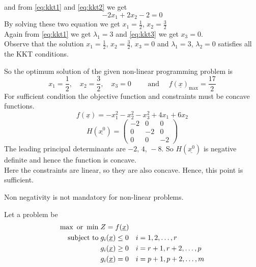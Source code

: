 \documentclass[../main-sheet.tex]{subfiles}
\begin{document}
\begin{soln}
\begin{enumerate}[label=Case \arabic*:]
\[            \]
            and from \eqref{eq:kkt1} and \eqref{eq:kkt2} we get
            \[
                -2x_1+2x_2-2=0
            \]
            By solving these two equation we get \(x_1=\frac{1}{2}\), \(x_2=\frac{3}{2}\)\\
            Again from \eqref{eq:kkt1} we get \(\lambda_1=3\) and \eqref{eq:kkt3} we get \(x_3=0\).\\
            Observe that the solution \(x_1=\frac{1}{2}\), \(x_2=\frac{3}{2}\), \(x_3=0\) and \(\lambda_1=3\), \(\lambda_2=0\) satisfies all the KKT conditions.
        \end{enumerate}
        So the optimum solution of the given non-linear programming problem is
        \[
            x_1=\frac{1}{2},\quad x_2=\frac{3}{2},\quad x_3=0\qquad \text{ and }\quad f(\underline{x})_{\max}=\frac{17}{2}
        \]
        For sufficient condition the objective function and constraints must be concave functions.
        \[
            f(\underline{x})=-x_1^2-x_2^2-x_3^2+4x_1+6x_2
        \]
        \[
            H(\underline{x^0})=\begin{pmatrix}
            -2&0&0\\
            0&-2&0\\
            0&0&-2
            \end{pmatrix}
        \]
        The leading principal determinants are \(-2,\,4,\,-8\). So \(H(\underline{x^0})\) is negative definite and hence the function is concave.\\
        Here the constraints are linear, so they are also concave. Hence, this point is sufficient.
    \end{soln}
    \begin{rem}
        Non negativity is not mandatory for non-linear problems.
    \end{rem}
    Let a problem be
    \begin{align*}
        \max\text{ or }\min &\; Z=f(\underline{x}) \\
        \text{subject to} &\;
        \begin{alignedat}[t]{1}
        g_i (\underline{x})& \leq 0 \quad i=1,2,\dots,r \\
        g_i (\underline{x})& \geq 0 \quad i=r+1,r+2,\dots,p \\
        g_i (\underline{x})&    = 0 \quad i=p+1,p+2,\dots,m
        \end{alignedat}
        \end{align*}
\end{document}

